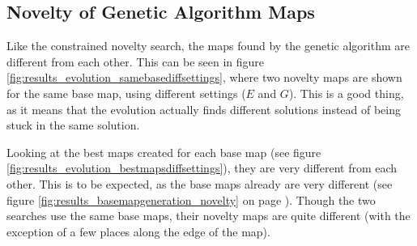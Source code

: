 \subsection{Novelty of Genetic Algorithm Maps}

Like the constrained novelty search, the maps found by the genetic algorithm are different from each other. This can be seen in figure \ref{fig:results_evolution_samebasediffsettings}, where two novelty maps are shown for the same base map, using different settings ($E$ and $G$). This is a good thing, as it means that the evolution actually finds different solutions instead of being stuck in the same solution.


Looking at the best maps created for each base map (see figure \ref{fig:results_evolution_bestmapsdiffsettings}), they are very different from each other. This is to be expected, as the base maps already are very different (see figure \ref{fig:results_basemapgeneration_novelty} on page \pageref{fig:results_basemapgeneration_novelty}). Though the two searches use  the same base maps, their novelty maps are quite different (with the exception of a few places along the edge of the map).

